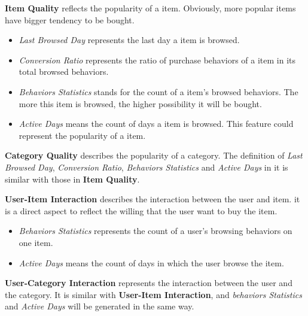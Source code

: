 \documentclass{llncs}
\begin{document}
\textbf{Item Quality} reflects the popularity of a item.
Obviously, more popular items have bigger tendency to be bought.
\begin{itemize}
	\item \emph{Last Browsed Day} represents the last day a item is browsed.
	
	\item \emph{Conversion Ratio} represents the ratio of purchase behaviors of a item
	in its total browsed behaviors.
	
	\item \emph{Behaviors Statistics} stands for the count of a item's browsed behaviors.
	The more this item is browsed, the higher possibility it will be bought.
	
	\item \emph{Active Days} means the count of days a item is browsed.
	This feature could represent the popularity of a item.
\end{itemize}

\textbf{Category Quality} describes the popularity of a category.
The definition of \emph{Last Browsed Day}, \emph{Conversion Ratio},
\emph{Behaviors Statistics} and \emph{Active Days} in it is similar
with those in \textbf{Item Quality}.

\textbf{User-Item Interaction} describes the interaction between the user and item.
it is a direct aspect to reflect the willing that the user want to buy the item.
\begin{itemize}
	\item \emph{Behaviors Statistics} represents the count of a user's browsing behaviors on one item.
	
	\item \emph{Active Days} means the count of days in which the user browse the item.
\end{itemize}

\textbf{User-Category Interaction} represents the interaction between the user and the category.
It is similar with \textbf{User-Item Interaction},
and \emph{behaviors Statistics} and \emph{Active Days} will be generated in the same way.
\end{document}
